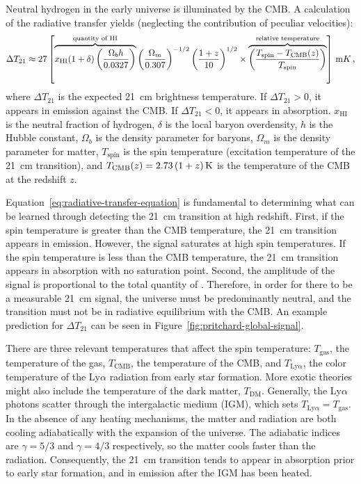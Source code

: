 \begin{bibunit}
Neutral hydrogen in the early universe is illuminated by the CMB. A calculation of the radiative
transfer \citep{2012RPPh...75h6901P} yields (neglecting the contribution of peculiar velocities):
\begin{equation}\label{eq:radiative-transfer-equation}
    \Delta T_{21} \approx 27 \left[
        \overbrace{
            x_\text{HI} (1+\delta)
            \left(\frac{\Omega_b h}{0.0327}\right)
        }^{\text{quantity of HI}}
        \left(\frac{\Omega_m}{0.307}\right)^{-1/2}
        \left(\frac{1+z}{10}\right)^{1/2} \linebreak \times
        \overbrace{
            \left(\frac{T_\text{spin} - T_\text{CMB}(z)}{T_\text{spin}}\right)
        }^{\text{relative temperature}}
    \right] \, {\rm mK} \,,
\end{equation}
where $\Delta T_{21}$ is the expected 21~cm brightness temperature. If $\Delta T_{21} > 0$, it
appears in emission against the CMB. If $\Delta T_{21} < 0$, it appears in absorption. $x_\text{HI}$
is the neutral fraction of hydrogen, $\delta$ is the local baryon overdensity, $h$ is the Hubble
constant, $\Omega_b$ is the density parameter for baryons, $\Omega_m$ is the density parameter for
matter, $T_\text{spin}$ is the spin temperature (excitation temperature of the 21~cm transition),
and $T_\text{CMB}(z) = 2.73\,(1+z)\,{\rm K}$ is the temperature of the CMB at the redshift $z$.

Equation~\ref{eq:radiative-transfer-equation} is fundamental to determining what can be learned
through detecting the 21~cm transition at high redshift. First, if the spin temperature is greater
than the CMB temperature, the 21~cm transition appears in emission. However, the signal saturates at
high spin temperatures. If the spin temperature is less than the CMB temperature, the 21~cm
transition appears in absorption with no saturation point. Second, the amplitude of the signal is
proportional to the total quantity of . Therefore, in order for there to be a measurable
21~cm signal, the universe must be predominantly neutral, and the transition must not be in
radiative equilibrium with the CMB. An example prediction for $\Delta T_{21}$ can be seen in
Figure~\ref{fig:pritchard-global-signal}.

There are three relevant temperatures that affect the spin temperature: $T_\text{gas}$, the
temperature of the gas, $T_\text{CMB}$, the temperature of the CMB, and $T_{\text{Ly}\alpha}$, the
color temperature of the Ly$\alpha$ radiation from early star formation. More exotic theories might
also include the temperature of the dark matter, $T_\text{DM}$. Generally,  the Ly$\alpha$ photons
scatter through the intergalactic medium (IGM), which sets $T_{\text{Ly}\alpha} = T_\text{gas}$. In
the absence of any heating mechanisms, the matter and radiation are both cooling adiabatically with
the expansion of the universe.  The adiabatic indices are $\gamma = 5/3$ and $\gamma = 4/3$
respectively, so the matter cools faster than the radiation. Consequently, the 21~cm transition
tends to appear in absorption prior to early star formation, and in emission after the IGM has been
heated.


\end{bibunit}

